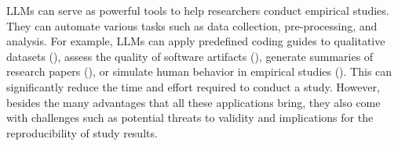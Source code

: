 LLMs can serve as powerful tools to help researchers conduct empirical studies.
They can automate various tasks such as data collection, pre-processing, and analysis.
For example, LLMs can apply predefined coding guides to qualitative datasets (\annotators), assess the quality of software artifacts (\judges), generate summaries of research papers (\synthesis), or simulate human behavior in empirical studies (\subjects).
This can significantly reduce the time and effort required to conduct a study.
However, besides the many advantages that all these applications bring, they also come with challenges such as potential threats to validity and implications for the reproducibility of study results.
